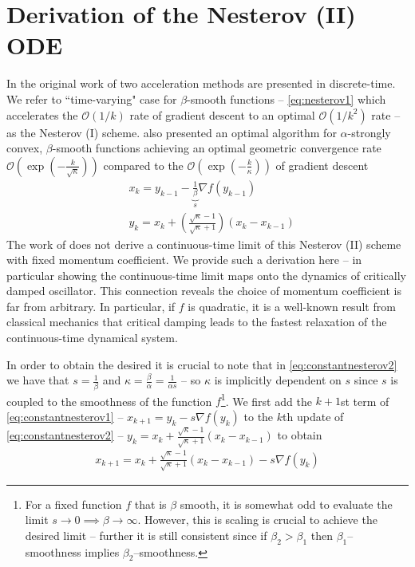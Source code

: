 \section{Derivation of the Nesterov (II) ODE}
In the original work of \citet{ nesterov2004introductory} two acceleration methods are presented in discrete-time. We refer to ``time-varying" case for $\beta$-smooth functions -- \eqref{eq:nesterov1} which accelerates the $\mathcal{O}(1/k)$ rate of gradient descent to an optimal $\mathcal{O}(1/k^2)$ rate -- as the Nesterov (I) scheme. \citet{ nesterov2004introductory} also presented an optimal algorithm for $\alpha$-strongly convex, $\beta$-smooth functions achieving an optimal geometric convergence rate $\mathcal{O} \left (\exp(-\frac{k}{\sqrt{\kappa}}) \right)$ compared to the $\mathcal{O} \left (\exp(-\frac{k}{\kappa}) \right)$ of gradient descent
\begin{align}
    & x_{k} = y_{k-1} - \underbrace{\frac{1}{\beta}}_{s} \nabla f(y_{k-1}) \label{eq:constantnesterov1} \\
    & y_{k} = x_{k} + \left( \frac{\sqrt{\kappa}-1}{\sqrt{\kappa}+1} \right) \left( x_{k} - x_{k-1} \right)  \label{eq:constantnesterov2}
\end{align}
 The work of \citet{su2014differential} does not derive a continuous-time limit of this Nesterov (II) scheme with fixed momentum coefficient. We provide such a derivation here -- in particular showing the continuous-time limit maps onto the dynamics of critically damped oscillator. This connection reveals the choice of momentum coefficient is far from arbitrary. In particular, if $f$ is quadratic, it is a well-known result from classical mechanics that critical damping leads to the fastest relaxation of the continuous-time dynamical system.

 
 In order to obtain the desired it is crucial to note that in \eqref{eq:constantnesterov2} we have that $s = \frac{1}{\beta}$ and $\kappa = \frac{\beta}{\alpha} = \frac{1}{\alpha s}$ -- so $\kappa$ is implicitly dependent on $s$ since $s$ is coupled to the smoothness of the function $f$\footnote{For a fixed function $f$ that is $\beta$ smooth, it is somewhat odd to evaluate the limit $s \to 0 \implies \beta \to \infty$. However, this is scaling is crucial to achieve the desired limit -- further it is still consistent since if $\beta_2 > \beta_1$ then $\beta_1$--smoothness implies $\beta_2$--smoothness.}. We first add the $k+1$st term of \eqref{eq:constantnesterov1} -- $x_{k+1} = y_k - s \nabla f(y_k)$ to the $k$th update of \eqref{eq:constantnesterov2} -- $y_k = x_k + \frac{\sqrt{\kappa}-1}{\sqrt{\kappa}+1} (x_k - x_{k-1})$ to obtain
 \begin{align*}
     x_{k+1} = x_{k} + \frac{\sqrt{\kappa}-1}{\sqrt{\kappa}+1}(x_{k}-x_{k-1}) - s \nabla f(y_k)
 \end{align*}

